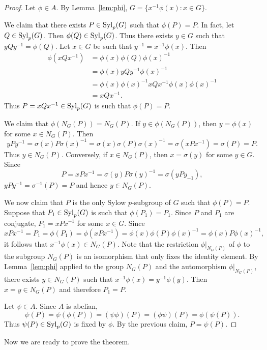 \begin{proof}
    Let $\phi\in A$. By Lemma~\ref{lem:phi}, 
    $G=\{x^{-1}\phi(x):x\in G\}$. 
    
    We claim that there exists $P\in\mathrm{Syl}_p(G)$ such that $\phi(P)=P$. In fact, 
    let $Q\in\mathrm{Syl}_p(G)$. Then $\phi(Q)\in\mathrm{Syl}_p(G)$. Thus 
    there exists $y\in G$ such that $yQy^{-1}=\phi(Q)$. Let $x\in G$ 
    be such that $y^{-1}=x^{-1}\phi(x)$. Then
    \begin{align*}
    \phi(xQx^{-1})&=\phi(x)\phi(Q)\phi(x)^{-1}\\
    &=\phi(x)yQy^{-1}\phi(x)^{-1}\\
    &=\phi(x)\phi(x)^{-1}xQx^{-1}\phi(x)\phi(x)^{-1}\\
    &=xQx^{-1}.      
    \end{align*}
    Thus $P=xQx^{-1}\in\mathrm{Syl}_p(G)$ is such that $\phi(P)=P$. 

    We claim that $\phi(N_G(P))=N_G(P)$. If $y\in \phi(N_G(P))$, then 
    $y=\phi(x)$ for some $x\in N_G(P)$. Then 
    \[
    yPy^{-1}=\sigma(x)P\sigma(x)^{-1}=\sigma(x)\sigma(P)\sigma(x)^{-1}=\sigma(xPx^{-1})=\sigma(P)=P.
    \]
    Thus $y\in N_G(P)$. Conversely, if $x\in N_G(P)$, then $x=\sigma(y)$ for some $y\in G$. Since 
    \[
    P=xPx^{-1}=\sigma(y)P\sigma(y)^{-1}=\sigma(yPy_{-1}),
    \]
    $yPy^{-1}=\sigma^{-1}(P)=P$ and hence $y\in N_G(P)$. 
    
    We now claim that $P$ is the only Sylow $p$-subgroup of $G$ such that $\phi(P)=P$. Suppose that 
    $P_1\in\mathrm{Syl}_p(G)$ is such that $\phi(P_1)=P_1$. 
    Since $P$ and $P_1$ are conjugate, 
    $P_1=xPx^{-1}$ for some $x\in G$. Since
    \[
    xPx^{-1}=P_1=\phi(P_1)=\phi(xPx^{-1})=\phi(x)\phi(P)\phi(x)^{-1}
    =\phi(x)P\phi(x)^{-1},
    \]
    it follows that 
    $x^{-1}\phi(x)\in N_G(P)$. Note that 
    the restriction $\phi|_{N_G(P)}$ of $\phi$ to 
    the subgroup $N_G(P)$ is an isomorphism that 
    only fixes the identity element. By Lemma~\ref{lem:phi}
    applied to the group $N_G(P)$ and the automorphism  
    $\phi|_{N_G(P)}$, 
    there exists $y\in N_G(P)$ such that $x^{-1}\phi(x)=y^{-1}\phi(y)$. Then $x=y\in N_G(P)$ and therefore
    $P_1=P$. 

    Let $\psi\in A$. Since $A$ is abelian, 
    \[
    \psi(P)=\psi(\phi(P))=(\psi\phi)(P)=(\phi\psi)(P)=\phi(\psi(P)).
    \]
    Thus $\psi(P)\in\mathrm{Syl}_p(G)$ is fixed by $\phi$. By the previous
    claim, $P=\psi(P)$. 
\end{proof}

Now we are ready to prove the theorem. 

